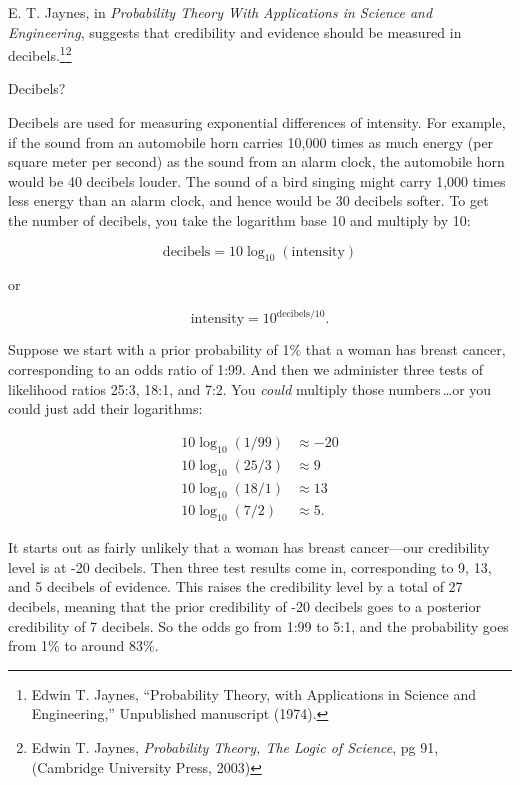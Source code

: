 {{\hr

{
 E. T. Jaynes, in \textit{Probability Theory With Applications in
Science and Engineering}, suggests that credibility and evidence should
be measured in decibels.\footnote{Edwin T. Jaynes, ``Probability Theory, with
Applications in Science and Engineering,''
Unpublished manuscript (1974).}\supercomma\footnote{Edwin T. Jaynes, {\em Probability Theory, The Logic of Science}, pg 91, (Cambridge University Press, 2003)}}

{
 Decibels?}

{
 Decibels are used for measuring exponential differences of
intensity. For example, if the sound from an automobile horn carries
10,000 times as much energy (per square meter per second) as the sound
from an alarm clock, the automobile horn would be 40 decibels louder.
The sound of a bird singing might carry 1,000 times less energy than an
alarm clock, and hence would be 30 decibels softer. To get the number
of decibels, you take the logarithm base 10 and multiply by 10:}

\begin{equation*}
  \text{decibels} = 10\log_{10}(\text{intensity})
\end{equation*}

{
 or}

\begin{equation*}
  \text{intensity} = 10^{\text{decibels}/10}.
\end{equation*}

{
 Suppose we start with a prior probability of 1\% that a woman has
breast cancer, corresponding to an odds ratio of 1:99. And then we
administer three tests of likelihood ratios 25:3, 18:1, and 7:2. You
\textit{could} multiply those numbers\,\ldots or you could just add their
logarithms:}

\begin{align*}
 10\log_{10}(1/99) &\approx -20 \\
 10\log_{10}(25/3) &\approx 9 \\
 10\log_{10}(18/1) &\approx 13 \\
 10\log_{10}(7/2) &\approx 5.
\end{align*}

{
 It starts out as fairly unlikely that a woman has breast
cancer---our credibility level is at -20 decibels. Then three test
results come in, corresponding to 9, 13, and 5 decibels of evidence.
This raises the credibility level by a total of 27 decibels, meaning
that the prior credibility of -20 decibels goes to a posterior
credibility of 7 decibels. So the odds go from 1:99 to 5:1, and the
probability goes from 1\% to around 83\%.}

}}
